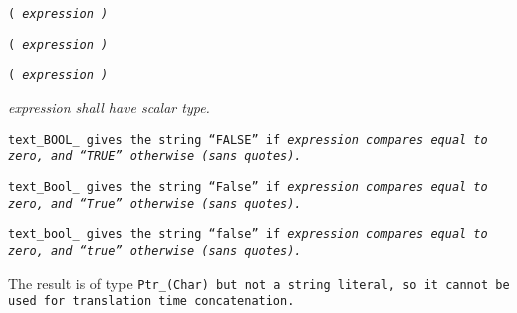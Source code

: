 
 \tt{(} \it{expression} \tt{)}

 \tt{(} \it{expression} \tt{)}

 \tt{(} \it{expression} \tt{)}


\it{expression} shall have scalar type.


\tt{text_BOOL_} gives the string ``\tt{FALSE}'' if \it{expression}
compares equal to zero, and ``\tt{TRUE}'' otherwise (sans quotes).

\tt{text_Bool_} gives the string ``\tt{False}'' if \it{expression}
compares equal to zero, and ``\tt{True}'' otherwise (sans quotes).

\tt{text_bool_} gives the string ``\tt{false}'' if \it{expression}
compares equal to zero, and ``\tt{true}'' otherwise (sans quotes).

The result is of type \tt{Ptr_(Char)} but not a string literal,
so it cannot be used for translation time concatenation.
